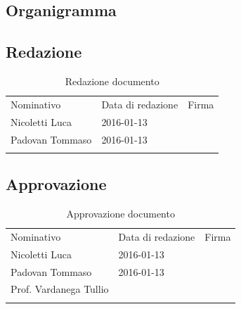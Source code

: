 \documentclass[a4paper]{article}
\begin{document}
	\begin{appendices}
	\newpage 
	\section{Organigramma}
		\subsection{Redazione}
		\begin{table}[H]
			\begin{tabularx}{\textwidth}{Y Y Y}
				Nominativo & Data di redazione & Firma\\
				Nicoletti Luca & 2016-01-13 & \\
				Padovan Tommaso & 2016-01-13 &\\
			\end{tabularx}
			\caption{Redazione documento } 
			\label{RedDocumento}
		\end{table}
		\subsection{Approvazione}
		\begin{table}[H]
			\begin{tabularx}{\textwidth}{Y Y Y}
				Nominativo & Data di redazione & Firma\\
				Nicoletti Luca & 2016-01-13 & \\
				Padovan Tommaso & 2016-01-13 & \\
				Prof. Vardanega Tullio & & \\
			\end{tabularx}
			\caption{Approvazione documento } 
			\label{AppDocumento}
		\end{table}

\end{appendices}
\end{document}
